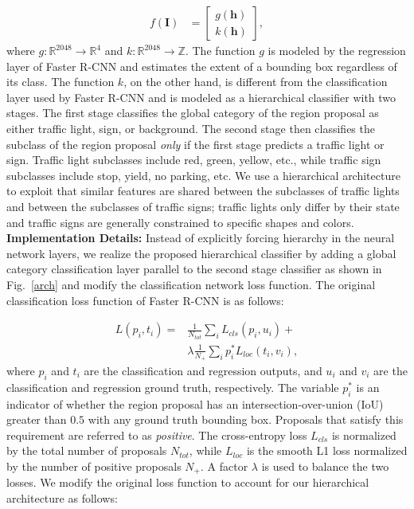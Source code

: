 \documentclass[10pt, conference, compsocconf]{IEEEtran}
\newcommand{\fig}[1]{Fig.~\ref{#1}}
\begin{document}
\begin{equation}
\begin{aligned}
f(\bm{I}) &= \begin{bmatrix}
g(\bm{h})\\ k(\bm{h}) 
\end{bmatrix},
\end{aligned}
\label{det_sol}
\end{equation}
where $g:\mathbb{R}^{2048} \rightarrow \mathbb{R}^4$ and $k:\mathbb{R}^{2048} \rightarrow \mathbb{Z}$. The function $g$ is modeled by the regression layer of Faster R-CNN and estimates the extent of a bounding box regardless of its class. The function $k$, on the other hand, is different from the classification layer used by Faster R-CNN and is modeled as a hierarchical classifier with two stages. The first stage classifies the global category of the region proposal as either traffic light, sign, or background. The second stage then classifies the subclass of the region proposal \textit{only} if the first stage predicts a traffic light or sign. Traffic light subclasses include red, green, yellow, etc., while traffic sign subclasses include stop, yield, no parking, etc. We use a hierarchical architecture to exploit that similar features are shared between the subclasses of traffic lights and between the subclasses of traffic signs; traffic lights only differ by their state and traffic signs are generally constrained to specific shapes and colors. \\

\noindent\textbf{Implementation Details:}  
Instead of explicitly forcing hierarchy in the neural network layers, we realize the proposed hierarchical classifier by adding a global category classification layer parallel to the second stage classifier as shown in \fig{arch} and modify the classification network loss function. The original classification loss function of Faster R-CNN is as follows:

\begin{equation}
\begin{aligned}
L({p_i}, {t_i}) = &\frac{1}{N_{tot}}\sum_i L_{cls}(p_i, u_i) + \\ &\lambda \frac{1}{N_{+}} \sum_i p^*_i L_{loc}(t_i, v_i),
\end{aligned}
\label{loss_original}
\end{equation}
where $p_i$ and $t_i$ are the classification and regression outputs, and $u_i$ and $v_i$ are the classification and regression ground truth, respectively. The variable $p^*_i$ is an indicator of whether the region proposal has an intersection-over-union (IoU) greater than $0.5$ with any ground truth bounding box. Proposals that satisfy this requirement are referred to as \textit{positive}. The cross-entropy loss $L_{cls}$ is normalized by the total number of proposals $N_{tot}$, while $L_{loc}$ is the smooth L1 loss normalized by the number of positive proposals $N_{+}$. A factor $\lambda$ is used to balance the two losses. We modify the original loss function to account for our hierarchical architecture as follows:
\end{document}
